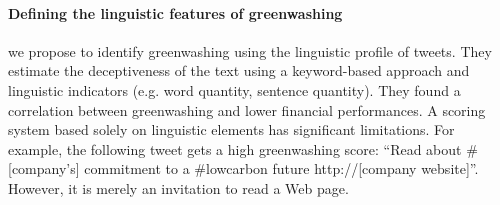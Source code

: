 \paragraph{Defining the linguistic features of greenwashing} \citet{divinus_oppong-tawiah_corporate_2023} we propose to identify greenwashing using the linguistic profile of tweets. They estimate the deceptiveness of the text using a keyword-based approach and linguistic indicators (e.g. word quantity, sentence quantity). They found a correlation between greenwashing and lower financial performances. A scoring system based solely on linguistic elements has significant limitations. For example, the following tweet gets a  high greenwashing score: ``Read about \#[company’s] commitment to a \#lowcarbon future http://[company website]''. However, it is merely an invitation to read a Web page. 











